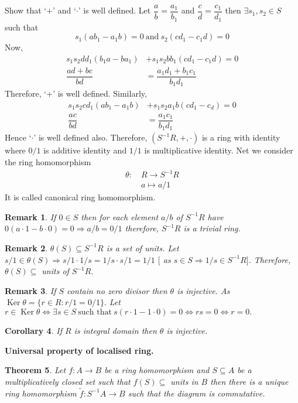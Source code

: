 \documentclass[11pt]{amsart}
\newtheorem{theorem}{Theorem}[section]
\newtheorem{remark}[theorem]{Remark}%
\newtheorem{corollary}[theorem]{Corollary}%
\begin{document}
Show that `$+$' and `$\cdot$' is well defined. Let $\dfrac{a}{b}=\dfrac{a_1}{b_1}$ and $\dfrac{c}{d}=\dfrac{c_1}{d_1}$ then $\exists s_1,s_2\in S$ such that $$s_1(ab_1-a_1b)=0 ~\text{and}~s_2(cd_1-c_1d)=0$$ Now, \begin{align*}
s_1s_2dd_1(b_1a-ba_1)&+s_1s_2bb_1(cd_1-c_1d)=0\\
\dfrac{ad+bc}{bd}&=\dfrac{a_1d_1+b_1c_1}{b_1d_1}
\end{align*}
Therefore, `$+$' is well defined.
Similarly, \begin{align*}
s_1s_2cd_1(ab_1-a_1b)&+s_1s_2a_1b(cd_1-c_d)=0\\
\dfrac{ac}{bd}&=\dfrac{a_1c_1}{b_1d_1}
\end{align*}
Hence `$\cdot$' is well defined also. Therefore, $\left(S^{-1}R,+,\cdot\right)$ is a ring with identity where $0/1$ is additive identity and $1/1$ is multiplicative identity. Net we consider the ring homomorphism \begin{align}
\theta:~&R\to S^{-1}R\\
&a\mapsto a/1 \nonumber
\end{align}
It is called canonical ring homomorphism. 
\begin{remark}
If $0\in S$ then for each element $a/b$ of $S^{-1}R$ have $0(a\cdot 1-b\cdot 0)=0 \Rightarrow a/b=0/1$ therefore, $S^{-1}R$ is a trivial ring.
\end{remark}
\begin{remark}
$\theta(S)\subseteq S^{-1}R$ is a set of units. Let $s/1\in \theta(S) \Rightarrow s/1\cdot 1/s=1/s \cdot s/1=1/1$ $[$ as $s\in S \Rightarrow 1/s \in S^{-1}R].$ Therefore, $\theta(S)\subseteq $ units of $S^{-1}R.$ 
\end{remark}
\begin{remark}
If $S$ contain no zero divisor then $\theta$ is injective. As $\operatorname{Ker}\theta=\{r\in R:r/1=0/1\}.$ Let $r\in \operatorname{Ker}\theta \Leftrightarrow \exists s\in S~\text{such that}~s(r\cdot 1-1\cdot 0)=0 \Leftrightarrow rs=0 \Leftrightarrow r=0.$
\end{remark}
\begin{corollary}
If $R$ is integral domain then $\theta$ is injective.
\end{corollary}
\textbf{Universal property of localised ring.}
\begin{theorem}
Let $f:A\to B$ be a ring homomorphism and $S\subseteq A$ be a multiplicatively closed set such that $f(S)\subseteq $ units in $B$ then there is a unique ring homomorphism $\tilde{f}:S^{-1}A\to B$ such that the diagram is commutative. 
\begin{center}
\end{center}
\end{theorem}
\end{document}
